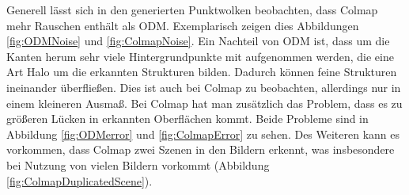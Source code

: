 \documentclass[12pt,titlepage, twoside]{article}
\begin{document}
Generell lässt sich in den generierten Punktwolken beobachten, dass Colmap mehr Rauschen enthält als ODM. 
Exemplarisch zeigen dies Abbildungen \ref{fig:ODMNoise} und \ref{fig:ColmapNoise}. 
Ein Nachteil von ODM ist, dass um die Kanten herum sehr viele Hintergrundpunkte mit aufgenommen werden, die eine Art Halo um die erkannten Strukturen bilden. 
Dadurch können feine Strukturen ineinander überfließen. Dies ist auch bei Colmap zu beobachten, allerdings nur in einem kleineren Ausmaß.
Bei Colmap hat man zusätzlich das Problem, dass es zu größeren Lücken in erkannten Oberflächen kommt.
Beide Probleme sind in Abbildung \ref{fig:ODMerror} und \ref{fig:ColmapError} zu sehen. 
Des Weiteren kann es vorkommen, dass Colmap zwei Szenen in den Bildern erkennt, was insbesondere bei Nutzung von vielen Bildern vorkommt (Abbildung \ref{fig:ColmapDuplicatedScene}).
\end{document}
